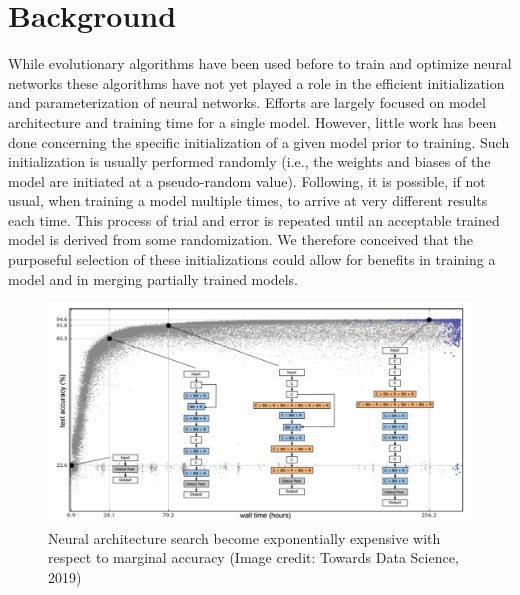 
\section{Background}
\label{sec:background}
While evolutionary algorithms have been used before to train and optimize neural networks these algorithms have not yet played a role in the efficient initialization and parameterization of neural networks. Efforts are largely focused on model architecture and training time for a single model. However, little work has been done concerning the specific initialization of a given model prior to training. Such initialization is usually performed randomly (i.e., the weights and biases of the model are initiated at a pseudo-random value). Following, it is possible, if not usual, when training a model multiple times, to arrive at very different results each time. This process of trial and error is repeated until an acceptable trained model is derived from some randomization. 
We therefore conceived that the purposeful selection of these initializations could allow for benefits in training a model and in merging partially trained models.

\begin{figure}[h!]
  \includegraphics[width=\linewidth]{figures/nas.png}
  \caption{Neural architecture search become exponentially expensive with respect to marginal accuracy (Image credit: Towards Data Science, 2019)}
  \label{fig:nas}
\end{figure}




